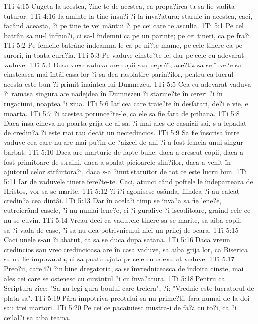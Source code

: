 1Ti 4:15  Cugeta la acestea, ?ine-te de acestea, ca propa?irea ta sa fie vadita tuturor.
1Ti 4:16  Ia aminte la tine însu?i ?i la înva?atura; staruie în acestea, caci, facând aceasta, ?i pe tine te vei mântui ?i pe cei care te asculta.
1Ti 5:1  Pe cel batrân sa nu-l înfrun?i, ci sa-l îndemni ca pe un parinte; pe cei tineri, ca pe fra?i.
1Ti 5:2  Pe femeile batrâne îndeamna-le ca pe ni?te mame, pe cele tinere ca pe surori, în toata cura?ia.
1Ti 5:3  Pe vaduve cinste?te-le, dar pe cele cu adevarat vaduve.
1Ti 5:4  Daca vreo vaduva are copii sau nepo?i, ace?tia sa se înve?e sa cinsteasca mai întâi casa lor ?i sa dea rasplatire parin?ilor, pentru ca lucrul acesta este bun ?i primit înaintea lui Dumnezeu.
1Ti 5:5  Cea cu adevarat vaduva ?i ramasa singura are nadejdea în Dumnezeu ?i staruie?te în cereri ?i în rugaciuni, noaptea ?i ziua.
1Ti 5:6  Iar cea care traie?te în desfatari, de?i e vie, e moarta.
1Ti 5:7  ?i acestea porunce?te-le, ca ele sa fie fara de prihana.
1Ti 5:8  Daca însa cineva nu poarta grija de ai sai ?i mai ales de casnicii sai, s-a lepadat de credin?a ?i este mai rau decât un necredincios.
1Ti 5:9  Sa fie înscrisa între vaduve cea care nu are mai pu?in de ?aizeci de ani ?i a fost femeia unui singur barbat;
1Ti 5:10  Daca are marturie de fapte bune: daca a crescut copii, daca a fost primitoare de straini, daca a spalat picioarele sfin?ilor, daca a venit în ajutorul celor strâmtora?i, daca s-a ?inut staruitor de tot ce este lucru bun.
1Ti 5:11  Iar de vaduvele tinere fere?te-te. Caci, atunci când poftele le îndeparteaza de Hristos, vor sa se marite.
1Ti 5:12  ?i î?i agonisesc osânda, fiindca ?i-au calcat credin?a cea dintâi.
1Ti 5:13  Dar în acela?i timp se înva?a sa fie lene?e, cutreierând casele, ?i nu numai lene?e, ci ?i guralive ?i iscoditoare, graind cele ce nu se cuvin.
1Ti 5:14  Vreau deci ca vaduvele tinere sa se marite, sa aiba copii, sa-?i vada de case, ?i sa nu dea potrivnicului nici un prilej de ocara.
1Ti 5:15  Caci unele s-au ?i abatut, ca sa se duca dupa satana.
1Ti 5:16  Daca vreun credincios sau vreo credincioasa are în casa vaduve, sa aiba grija lor, ca Biserica sa nu fie împovarata, ci sa poata ajuta pe cele cu adevarat vaduve.
1Ti 5:17  Preo?ii, care î?i ?in bine dregatoria, sa se învredniceasca de îndoita cinste, mai ales cei care se ostenesc cu cuvântul ?i cu înva?atura.
1Ti 5:18  Pentru ca Scriptura zice: "Sa nu legi gura boului care treiera", ?i: "Vrednic este lucratorul de plata sa".
1Ti 5:19  Pâra împotriva preotului sa nu prime?ti, fara numai de la doi sau trei martori.
1Ti 5:20  Pe cei ce pacatuiesc mustra-i de fa?a cu to?i, ca ?i ceilal?i sa aiba teama.
